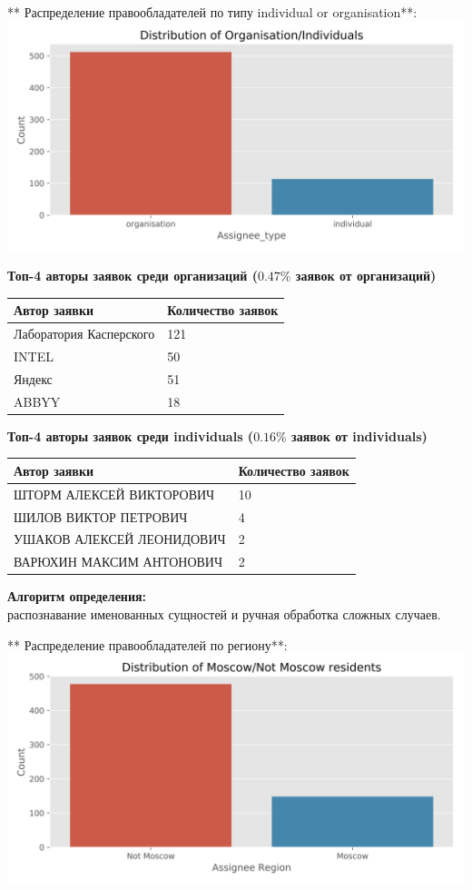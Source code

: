 \documentclass[11pt]{article}
\makeatletter
\def\maxwidth{\ifdim\Gin@nat@width>\linewidth\linewidth
    \else\Gin@nat@width\fi}
\let\Oldincludegraphics\includegraphics
\renewcommand{\includegraphics}[1]{\Oldincludegraphics[width=.8\maxwidth]{#1}}
\makeatother
\begin{document}
    ** Распределение правообладателей по типу individual or organisation**:
\includegraphics{../reports/figures/Distribution of OrganisationIndividuals.png}

    \textbf{Топ-4 авторы заявок среди организаций (\(0.47\%\) заявок от
организаций)}

\begin{longtable}[]{@{}ll@{}}
\toprule
Автор заявки & Количество заявок\tabularnewline
\midrule
\endhead
Лаборатория Касперского & 121\tabularnewline
INTEL & 50\tabularnewline
Яндекс & 51\tabularnewline
ABBYY & 18\tabularnewline
\bottomrule
\end{longtable}

\textbf{Топ-4 авторы заявок среди individuals (\(0.16\%\) заявок от
individuals)}

\begin{longtable}[]{@{}ll@{}}
\toprule
Автор заявки & Количество заявок\tabularnewline
\midrule
\endhead
ШТОРМ АЛЕКСЕЙ ВИКТОРОВИЧ & 10\tabularnewline
ШИЛОВ ВИКТОР ПЕТРОВИЧ & 4\tabularnewline
УШАКОВ АЛЕКСЕЙ ЛЕОНИДОВИЧ & 2\tabularnewline
ВАРЮХИН МАКСИМ АНТОНОВИЧ & 2\tabularnewline
\bottomrule
\end{longtable}

    \textbf{Алгоритм определения:}\\
распознавание именованных сущностей и ручная обработка сложных случаев.

    ** Распределение правообладателей по региону**:
\includegraphics{../reports/figures/Distribution of MoscowNot Moscow residents.png}
\end{document}
